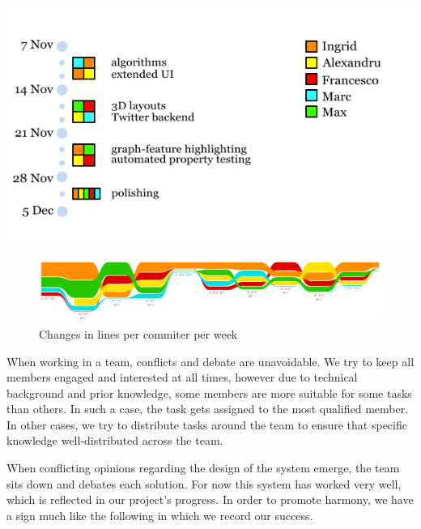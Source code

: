 \documentclass[a4paper,11pt,titlepage]{article}
\let\stdsection\section         %
\renewcommand{\section}{\newpage\stdsection}
\begin{document}
\includegraphics[scale=0.5]{work}


\begin{figure}[ht]
  \begin{minipage}[b]{0.5\linewidth}
\includegraphics[scale=0.5]{impact}
\caption{Changes in lines per commiter per week}
  \end{minipage}
\end{figure}

When working in a team, conflicts and debate are unavoidable. We try to keep all members engaged and interested at all times, however due to technical background and prior knowledge, some members are more suitable for some tasks than others. In such a case, the task gets assigned to the most qualified member. In other cases, we try to distribute tasks around the team to ensure that specific knowledge well-distributed across the team.

When conflicting opinions regarding the design of the system emerge, the team sits down and debates each solution. For now this system has worked very well, which is reflected in our project’s progress. In order to promote harmony, we have a sign much like the following in which we record our success.



\end{document}

